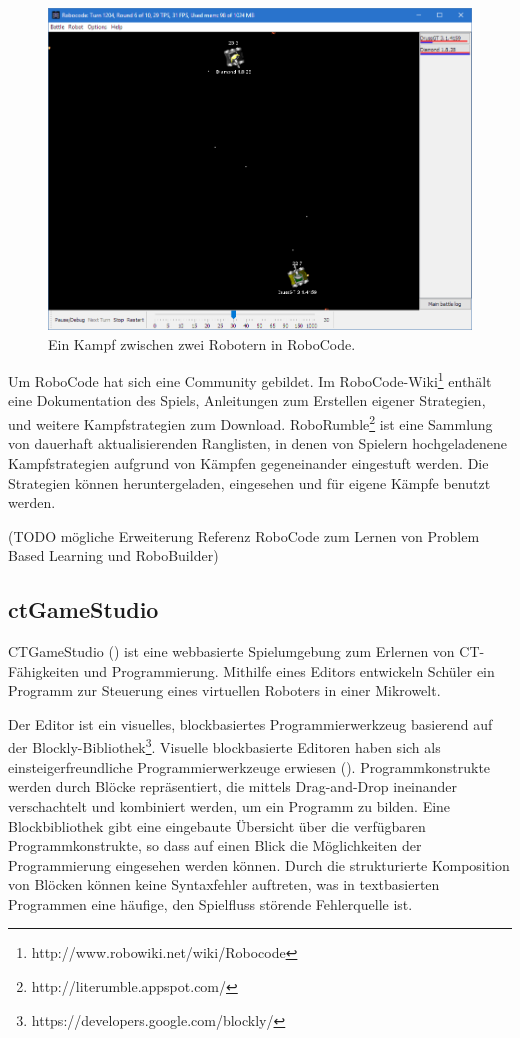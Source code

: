 \begin{figure}
  \caption{Ein Kampf zwischen zwei Robotern in RoboCode.}

  \label{robocode}
  
  \includegraphics{figures/RoboCode.png}
\end{figure}

Um RoboCode hat sich eine Community gebildet. Im
RoboCode-Wiki\footnote{http://www.robowiki.net/wiki/Robocode} enthält eine Dokumentation des Spiels,
Anleitungen zum Erstellen eigener Strategien, und weitere Kampfstrategien zum Download.
RoboRumble\footnote{http://literumble.appspot.com/} ist eine Sammlung von dauerhaft aktualisierenden
Ranglisten, in denen von Spielern hochgeladenene Kampfstrategien aufgrund von Kämpfen gegeneinander
eingestuft werden. Die Strategien können heruntergeladen, eingesehen und für eigene Kämpfe benutzt
werden.

(TODO mögliche Erweiterung Referenz RoboCode zum Lernen von Problem Based Learning und RoboBuilder)

\subsection{ctGameStudio}

CTGameStudio (\cite{werneburg_ctgamestudiogame-based_2018}) ist eine webbasierte Spielumgebung zum
Erlernen von CT-Fähigkeiten und Programmierung. Mithilfe eines Editors entwickeln Schüler ein
Programm zur Steuerung eines virtuellen Roboters in einer Mikrowelt.

Der Editor ist ein visuelles, blockbasiertes Programmierwerkzeug basierend auf der
Blockly-Bibliothek\footnote{https://developers.google.com/blockly/}. Visuelle blockbasierte Editoren
haben sich als einsteigerfreundliche Programmierwerkzeuge erwiesen (\cite{weintrop_block_2015}).
Programmkonstrukte werden durch Blöcke repräsentiert, die mittels Drag-and-Drop ineinander
verschachtelt und kombiniert werden, um ein Programm zu bilden. Eine Blockbibliothek gibt eine
eingebaute Übersicht über die verfügbaren Programmkonstrukte, so dass auf einen Blick die
Möglichkeiten der Programmierung eingesehen werden können. Durch die strukturierte Komposition von
Blöcken können keine Syntaxfehler auftreten, was in textbasierten Programmen eine häufige, den
Spielfluss störende Fehlerquelle ist.

